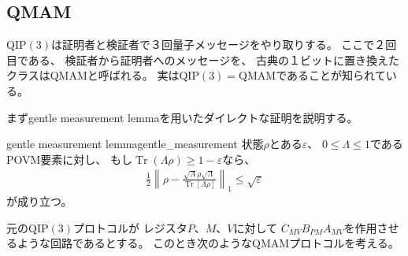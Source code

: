 \documentclass[a4paper, 10pt]{jsarticle}
\DeclareMathOperator{\Tr}{Tr}
\begin{document}
\subsection{QMAM}
$\mathrm{QIP}(3)$は証明者と検証者で３回量子メッセージをやり取りする。
ここで２回目である、
検証者から証明者へのメッセージを、
古典の１ビットに置き換えたクラスはQMAMと呼ばれる。
実は$\mathrm{QIP}(3) = \mathrm{QMAM}$であることが知られている。

まずgentle measurement lemmaを用いたダイレクトな証明を説明する。
\begin{lem}{gentle measurement lemma}{gentle_measurement}
	状態$\rho$とある$\varepsilon$、
	$0 \leq \Lambda \leq 1$であるPOVM要素に対し、
	もし$\Tr(\Lambda \rho) \geq 1 - \varepsilon$なら、
	\begin{align}
		\frac{1}{2} \left\| \rho
		- \frac{\sqrt{\Lambda} \rho \sqrt{\Lambda}}
		{\Tr\left[ \Lambda \rho \right]} \right\|_1
		\leq \sqrt{\varepsilon}
	\end{align}
	が成り立つ。
\end{lem}
元の$\mathrm{QIP}(3)$プロトコルが
レジスタ$P$、$M$、$V$に対して
$C_{MV} B_{PM} A_{MV}$を作用させるような回路であるとする。
このとき次のようなQMAMプロトコルを考える。
\end{document}
